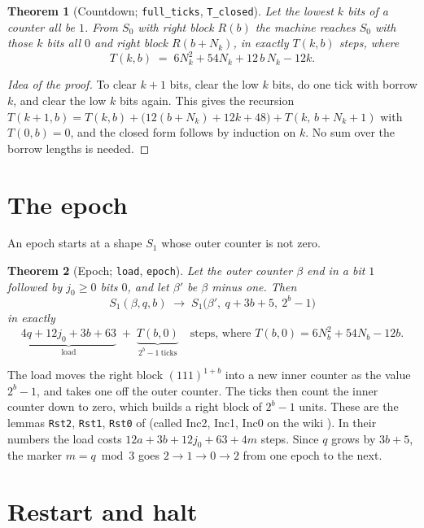 \documentclass[11pt]{article}
\newtheorem{theorem}{Theorem}
\theoremstyle{remark}
\newcommand{\coq}[1]{\texttt{#1}}
\begin{document}
\begin{theorem}[Countdown; \coq{full\_ticks}, \coq{T\_closed}]\label{thm:count}
Let the lowest $k$ bits of a counter all be $1$. From $S_0$ with right block
$R(b)$ the machine reaches $S_0$ with those $k$ bits all $0$ and right block
$R(b+N_k)$, in exactly $T(k,b)$ steps, where
\[
T(k,b) \;=\; 6N_k^{2} + 54N_k + 12\,b\,N_k - 12k .
\]
\end{theorem}

\begin{proof}[Idea of the proof]
To clear $k+1$ bits, clear the low $k$ bits, do one tick with borrow $k$, and
clear the low $k$ bits again. This gives the recursion
$T(k+1,b) = T(k,b) + \bigl(12(b+N_k)+12k+48\bigr) + T(k,\,b+N_k+1)$ with
$T(0,b)=0$, and the closed form follows by induction on $k$. No sum over the
borrow lengths is needed.
\end{proof}

\section{The epoch}

An epoch starts at a shape $S_1$ whose outer counter is not zero.

\begin{theorem}[Epoch; \coq{load}, \coq{epoch}]\label{thm:epoch}
Let the outer counter $\beta$ end in a bit $1$ followed by $j_0\ge 0$ bits $0$,
and let $\beta'$ be $\beta$ minus one. Then
\[
S_1(\beta, q, b) \;\longrightarrow\; S_1\bigl(\beta',\ q+3b+5,\ 2^{b}-1\bigr)
\]
in exactly
\[
\underbrace{4q + 12j_0 + 3b + 63}_{\text{load}} \;+\; \underbrace{T(b,0)}_{2^{b}-1\ \text{ticks}}
\quad\text{steps, where } T(b,0) = 6N_b^{2}+54N_b-12b .
\]
\end{theorem}

The load moves the right block $(111)^{1+b}$ into a new inner counter as the
value $2^{b}-1$, and takes one off the outer counter. The ticks then count the
inner counter down to zero, which builds a right block of $2^{b}-1$ units.
These are the lemmas \coq{Rst2}, \coq{Rst1}, \coq{Rst0} of \cite{mxdys} (called
Inc2, Inc1, Inc0 on the wiki \cite{wiki}). In their numbers the load costs
$12a + 3b + 12j_0 + 63 + 4m$ steps. Since $q$ grows by $3b+5$, the marker
$m = q \bmod 3$ goes $2 \to 1 \to 0 \to 2$ from one epoch to the next.

\section{Restart and halt}
\end{document}

